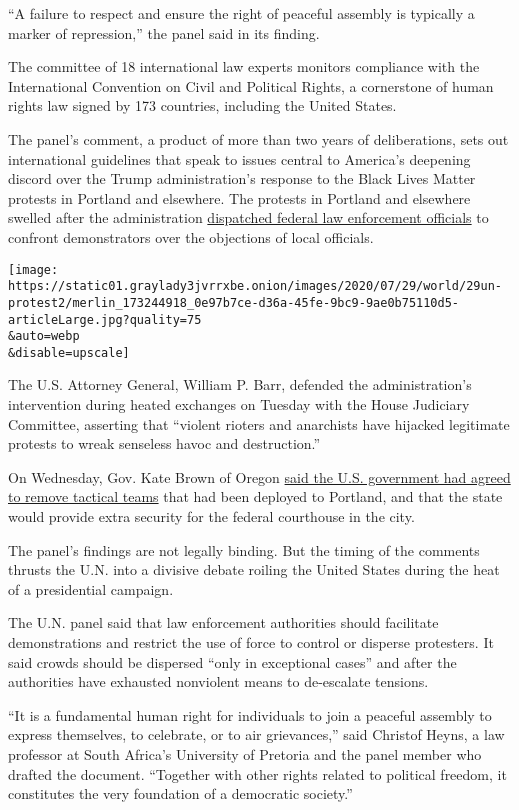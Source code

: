 ``A failure to respect and ensure the right of peaceful assembly is
typically a marker of repression,'' the panel said in its finding.

The committee of 18 international law experts monitors compliance with
the International Convention on Civil and Political Rights, a
cornerstone of human rights law signed by 173 countries, including the
United States.

The panel's comment, a product of more than two years of deliberations,
sets out international guidelines that speak to issues central to
America's deepening discord over the Trump administration's response to
the Black Lives Matter protests in Portland and elsewhere. The protests
in Portland and elsewhere swelled after the administration
\href{https://www.nytimes3xbfgragh.onion/2020/07/28/us/portland-protests-fact-check.html}{dispatched
federal law enforcement officials} to confront demonstrators over the
objections of local officials.

\texttt{[image: https://static01.graylady3jvrrxbe.onion/images/2020/07/29/world/29un-protest2/merlin\_173244918\_0e97b7ce-d36a-45fe-9bc9-9ae0b75110d5-articleLarge.jpg?quality=75\\\&auto=webp\\\&disable=upscale]}

The U.S. Attorney General, William P. Barr, defended the
administration's intervention during heated exchanges on Tuesday with
the House Judiciary Committee, asserting that ``violent rioters and
anarchists have hijacked legitimate protests to wreak senseless havoc
and destruction.''

On Wednesday, Gov. Kate Brown of Oregon
\href{https://www.nytimes3xbfgragh.onion/2020/07/29/us/protests-portland-federal-withdrawal.html}{said
the U.S. government had agreed to remove tactical teams} that had been
deployed to Portland, and that the state would provide extra security
for the federal courthouse in the city.

The panel's findings are not legally binding. But the timing of the
comments thrusts the U.N. into a divisive debate roiling the United
States during the heat of a presidential campaign.

The U.N. panel said that law enforcement authorities should facilitate
demonstrations and restrict the use of force to control or disperse
protesters. It said crowds should be dispersed ``only in exceptional
cases'' and after the authorities have exhausted nonviolent means to
de-escalate tensions.

``It is a fundamental human right for individuals to join a peaceful
assembly to express themselves, to celebrate, or to air grievances,''
said Christof Heyns, a law professor at South Africa's University of
Pretoria and the panel member who drafted the document. ``Together with
other rights related to political freedom, it constitutes the very
foundation of a democratic society.''

